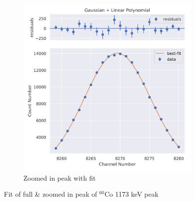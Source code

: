 \documentclass[11pt,a4paper]{article}
\newcommand{\element}[2]{$^{#2}\textrm{#1}$}
\begin{document}
\begin{figure}[H]
\begin{subfigure}{.5\linewidth}
    \includegraphics[width=\linewidth]{./Images/Cobalt60/Linear/Linear_1_Zoom.png}
    \caption{Zoomed in peak with fit}
  \end{subfigure}
  \caption{Fit of full \& zoomed in peak of \element{Co}{60} 1173 keV peak}
\end{figure}
\end{document}
